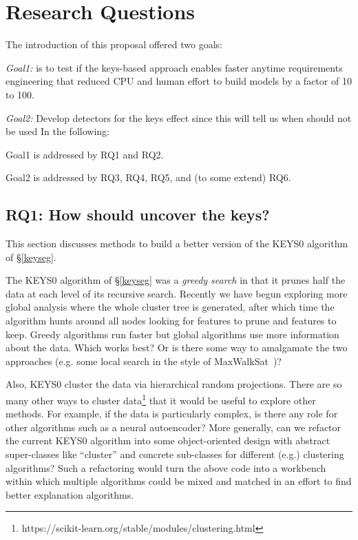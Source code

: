                  



\section{Research Questions}

\noindent The introduction of this proposal offered two goals:
\bi
\item
{\em Goal1:}
is to test if the  keys-based {\IT} approach enables faster anytime requirements engineering that reduced CPU and human effort to build
models by a factor of 10 to 100. 
\item
{\em Goal2:} Develop detectors for the keys effect since this will tell us when {\IT} should not be used
\ei
In the following:
\bi
\item
Goal1 is addressed by RQ1 and RQ2.  
\item
Goal2 is addressed by RQ3, RQ4, RQ5, and  (to some extend) RQ6.
\ei 
 \subsection{RQ1: How should {\IT} uncover the keys?}
This section discusses methods to
 build a better version of the KEYS0 algorithm of \S\ref{keyseg}.
 
 
 The KEYS0 algorithm of \S\ref{keyseg}
 was a {\em greedy search} in that it prunes half the data at each level of its recursive search.  
 Recently we have begun exploring more global analysis where the whole
 cluster tree is generated, after which time the algorithm hunts around all nodes looking for features to prune
 and features to keep. Greedy algorithms run faster but global algorithms use more information about the data.
 Which works best? Or is there some way to amalgamate the two approaches (e.g. some local search in the style
 of MaxWalkSat~\cite{kautz96})?
 
Also, KEYS0 cluster the data via hierarchical random projections. There are so many other ways to cluster data\footnote{https://scikit-learn.org/stable/modules/clustering.html} that it would be useful to explore other methods.
For example, if the data is particularly complex, is there any role for other algorithms such as 
 a neural autoencoder?  More generally,
 can we refactor the current KEYS0 algorithm into some object-oriented
 design with abstract super-classes like ``cluster''
and concrete sub-classes for
 different (e.g.) clustering algorithms? Such a refactoring
 would turn the above code into a workbench within
 which multiple algorithms could be mixed and matched
 in an effort to find better explanation algorithms.
 
